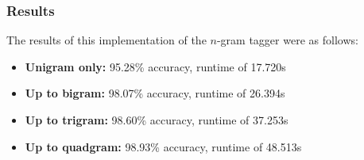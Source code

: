 \subsubsection{Results}
The results of this implementation of the $n$-gram tagger were as follows:
\begin{itemize}
    \item \textbf{Unigram only:} 95.28\% accuracy, runtime of 17.720s
    \item \textbf{Up to bigram:} 98.07\% accuracy, runtime of 26.394s
    \item \textbf{Up to trigram:} 98.60\% accuracy, runtime of 37.253s
    \item \textbf{Up to quadgram:} 98.93\% accuracy, runtime of 48.513s
\end{itemize}
